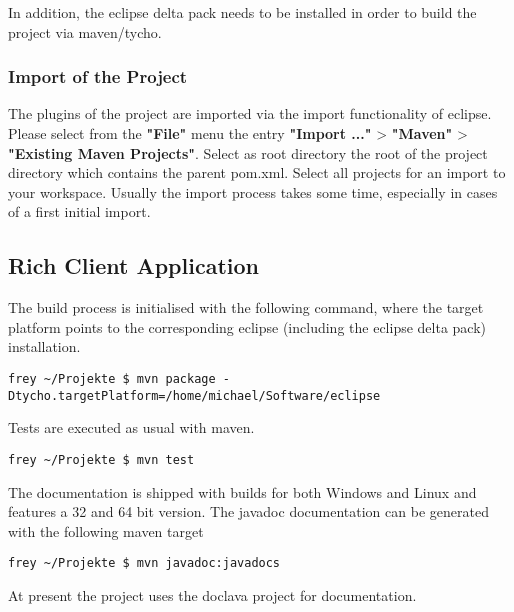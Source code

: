 In addition, the eclipse delta pack needs to be installed in order to build the 
project via maven/tycho.
 
\subsubsection{Import of the Project}
The plugins of the project are imported via the import functionality of eclipse.
Please select from the \textbf{"File"} menu the entry \textbf{"Import ..."} > 
\textbf{"Maven"} > \textbf{"Existing Maven Projects"}. Select as root
directory the root of the project directory which contains the parent pom.xml. 
Select all projects for an import to your workspace. Usually the import process
takes some time, especially in cases of a first initial import. 

\subsection{Rich Client Application}
The build process is initialised with the following command, where the target 
platform points to the corresponding eclipse (including the eclipse delta pack) 
installation.
\begin{lstlisting}[language=CMD, caption={\emph{Command for building the Flow RCP Application}},label={lst:shell}]
frey ~/Projekte $ mvn package -Dtycho.targetPlatform=/home/michael/Software/eclipse
\end{lstlisting}
Tests are executed as usual with maven.
\begin{lstlisting}[language=CMD, caption={\emph{Command for testing the Flow RCP Application}},label={lst:shell}]
frey ~/Projekte $ mvn test
\end{lstlisting}
The documentation is shipped with builds for both Windows and Linux and features
a 32 and 64 bit version. The javadoc documentation can be generated with the 
following maven target
\begin{lstlisting}[language=CMD, caption={\emph{Command for generating documentation the Flow RCP Application}},label={lst:shell}]
frey ~/Projekte $ mvn javadoc:javadocs
\end{lstlisting}
At present the project uses the doclava project for documentation.


